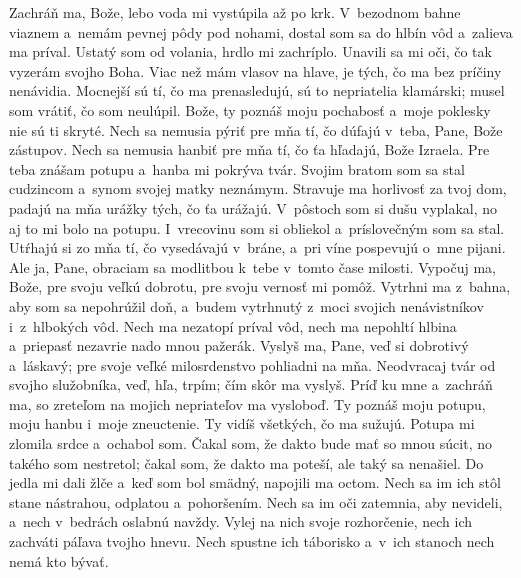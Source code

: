 Zachráň ma, Bože, lebo voda mi vystúpila až po krk.
\versseparator
V~bezodnom bahne viaznem a~nemám pevnej pôdy pod nohami,
\versseparator
dostal som sa do hlbín vôd a~zalieva ma príval.
\versseparator
Ustatý som od volania, hrdlo mi zachríplo.
Unavili sa mi oči, čo tak vyzerám svojho Boha.
\versseparator
Viac než mám vlasov na hlave,
je tých, čo ma bez príčiny nenávidia.
\versseparator
Mocnejší sú tí, čo ma prenasledujú, sú to nepriatelia klamárski;
musel som vrátiť, čo som neulúpil.
\versseparator
Bože, ty poznáš moju pochabosť
a~moje poklesky nie sú ti skryté.
\versseparator
Nech sa nemusia pýriť pre mňa tí, čo dúfajú v~teba,
Pane, Bože zástupov.
\versseparator
Nech sa nemusia hanbiť pre mňa tí,
čo ťa hľadajú, Bože Izraela.
\versseparator
Pre teba znášam potupu
a~hanba mi pokrýva tvár.
\versseparator
Svojim bratom som sa stal cudzincom
a~synom svojej matky neznámym.
\versseparator
Stravuje ma horlivosť za tvoj dom,
padajú na mňa urážky tých, čo ťa urážajú.
\versseparator
V~pôstoch som si dušu vyplakal,
no aj to mi bolo na potupu.
\versseparator
 I~vrecovinu som si obliekol
a~príslovečným som sa stal.
\versseparator
Utŕhajú si zo mňa tí, čo vysedávajú v~bráne,
a~pri víne pospevujú o~mne pijani.
\versseparator
Ale ja, Pane, obraciam sa modlitbou k~tebe
v~tomto čase milosti.
\versseparator
Vypočuj ma, Bože, pre svoju veľkú dobrotu,
pre svoju vernosť mi pomôž.
\versseparator
Vytrhni ma z~bahna, aby som sa nepohrúžil doň,
a~budem vytrhnutý z~moci svojich nenávistníkov
 i~z~hlbokých vôd.
\versseparator
Nech ma nezatopí príval vôd,
nech ma nepohltí hlbina
a~priepasť nezavrie nado mnou pažerák.
\versseparator
Vyslyš ma, Pane, veď si dobrotivý a~láskavý;
pre svoje veľké milosrdenstvo pohliadni na mňa.
\versseparator
Neodvracaj tvár od svojho služobníka,
veď, hľa, trpím; čím skôr ma vyslyš.
\versseparator
Príď ku mne a~zachráň ma,
so zreteľom na mojich nepriateľov ma vysloboď.
\versseparator
Ty poznáš moju potupu,
moju hanbu i~moje zneuctenie.
\versseparator
Ty vidíš všetkých, čo ma sužujú.
Potupa mi zlomila srdce a~ochabol som.
\versseparator
Čakal som, že dakto bude mať so mnou súcit, no takého som nestretol;
čakal som, že dakto ma poteší, ale taký sa nenašiel.
\versseparator
Do jedla mi dali žlče
a~keď som bol smädný, napojili ma octom.
\versseparator
Nech sa im ich stôl stane nástrahou,
odplatou a~pohoršením.
\versseparator
Nech sa im oči zatemnia, aby nevideli,
a~nech v~bedrách oslabnú navždy.
\versseparator
Vylej na nich svoje rozhorčenie,
nech ich zachváti páľava tvojho hnevu.
\versseparator
Nech spustne ich táborisko
a~v~ich stanoch nech nemá kto bývať.
